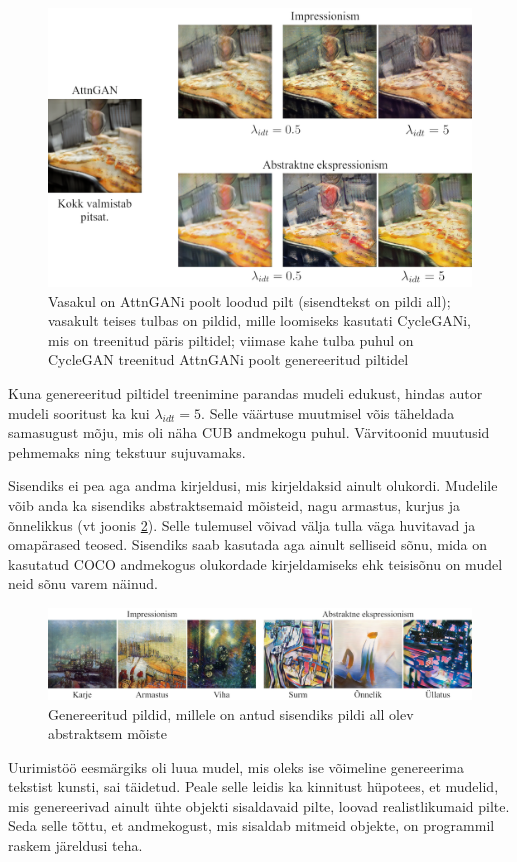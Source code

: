 \documentclass{vilgym}
\begin{document}
	\begin{figure}[ht]
		\includegraphics[width=0.9\linewidth]{images/coco.png}
		\caption{Vasakul on AttnGANi poolt loodud pilt (sisendtekst on pildi all); vasakult teises tulbas on pildid, mille loomiseks kasutati CycleGANi, mis on treenitud päris piltidel; viimase kahe tulba puhul on CycleGAN treenitud AttnGANi poolt genereeritud piltidel}
		\label{fig:coco}
	\end{figure}
	Kuna genereeritud piltidel treenimine parandas mudeli edukust, hindas autor mudeli sooritust ka kui $ \lambda_{idt} = 5 $. Selle väärtuse muutmisel võis täheldada samasugust mõju, mis oli näha CUB andmekogu puhul. Värvitoonid muutusid pehmemaks ning tekstuur sujuvamaks. 

	Sisendiks ei pea aga andma kirjeldusi, mis kirjeldaksid ainult olukordi. Mudelile võib anda ka sisendiks abstraktsemaid mõisteid, nagu armastus, kurjus ja õnnelikkus (vt joonis \ref{fig:abstract}). Selle tulemusel võivad välja tulla väga huvitavad ja omapärased teosed. Sisendiks saab kasutada aga ainult selliseid sõnu, mida on kasutatud COCO andmekogus olukordade kirjeldamiseks ehk teisisõnu on mudel neid sõnu varem näinud.

	\begin{figure}[ht]
		\includegraphics[width=\linewidth]{images/abstraktne.png}
		\caption{Genereeritud pildid, millele on antud sisendiks pildi all olev abstraktsem mõiste}
		\label{fig:abstract}
	\end{figure}
	Uurimistöö eesmärgiks oli luua mudel, mis oleks ise võimeline genereerima tekstist kunsti, sai täidetud. Peale selle leidis ka kinnitust hüpotees, et mudelid, mis genereerivad ainult ühte objekti sisaldavaid pilte, loovad realistlikumaid pilte. Seda selle tõttu, et andmekogust, mis sisaldab mitmeid objekte, on programmil raskem järeldusi teha.
	
\end{document}
